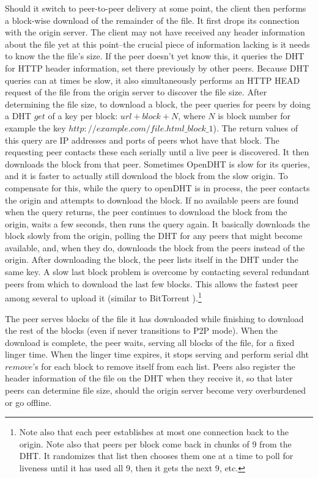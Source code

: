 \begin{enumerate}
Should it switch to peer-to-peer delivery at some point, the client then performs a block-wise download of the remainder of the file.  It first drops its connection with the origin server.  The client may not have received any header information about the file yet at this point--the crucial piece of information lacking is it needs to know the the file's size.  If the peer doesn't yet know this, it queries the DHT for HTTP header information, set there previously by other peers.  Because DHT queries can at times be slow, it also simultaneously performs an HTTP HEAD request of the file from the origin server to discover the file size.  After determining the file size, to download a block, the peer queries for peers by doing a DHT $get$ of a key per block: $url+block+N$, where $N$ is block number for example the key $http://example.com/file.html\_block\_1$).  The return values of this query are IP addresses and ports of peers whot have that block.  The requesting peer contacts these each serially until a live peer is discovered.  It then downloads the block from that peer.  
Sometimes OpenDHT is slow for its queries, and it is faster to actually still download the block from the slow origin.  To compensate for this, while the query to openDHT is in process, the peer contacts the origin and attempts to download the block.  If no available peers are found when the query returns, the peer continues to download the block from the origin, waits a few seconds, then runs the query again.  It basically downloads the block slowly from the origin, polling the DHT for any peers that might become available, and, when they do, downloads the block from the peers instead of the origin.  After downloading the block, the peer lists itself in the DHT under the same key.
A slow last block problem is overcome by contacting several redundant peers from which to download the last few blocks.  This allows the fastest peer among several to upload it (similar to BitTorrent \cite{bittorrent}).\footnote{Note also that each peer establishes at most one connection back to the origin.  Note also that peers per block come back in chunks of 9 from the DHT.  It randomizes that list then chooses them one at a time to poll for liveness until it has used all 9, then it gets the next 9, etc.}
\end{enumerate}

The peer serves blocks of the file it has downloaded while finishing to download the rest of the blocks (even if never transitions to P2P mode).  When the download is complete, the peer waits, serving all blocks of the file, for a fixed linger time.  When the linger time expires, it stops serving and perform serial dht $remove$'s for each block to remove itself from each list.  Peers also register the header information of the file on the DHT when they receive it, so that later peers can determine file size, should the origin server become very overburdened or go offline.

